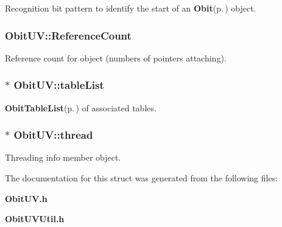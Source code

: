 Recognition bit pattern to identify the start of an {\bf Obit}{\rm (p.\,\pageref{structObit})} object. 

\subsubsection{ {\bf Obit\-UV::Reference\-Count}}\label{structObitUV_o2}


Reference count for object (numbers of pointers attaching). 

\subsubsection{$\ast$ {\bf Obit\-UV::table\-List}}\label{structObitUV_o9}


{\bf Obit\-Table\-List}{\rm (p.\,\pageref{structObitTableList})} of associated tables. 

\subsubsection{$\ast$ {\bf Obit\-UV::thread}}\label{structObitUV_o4}


Threading info member object. 



The documentation for this struct was generated from the following files:\begin{CompactItemize}
\item 
{\bf Obit\-UV.h}\item 
{\bf Obit\-UVUtil.h}\end{CompactItemize}
